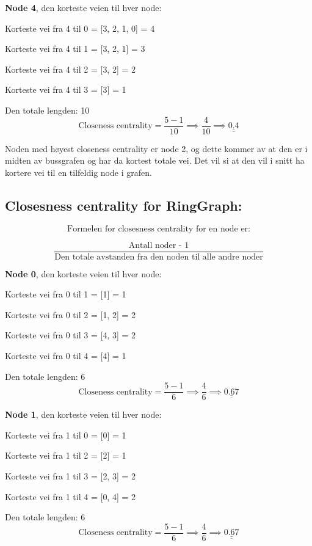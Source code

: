 \documentclass[11pt]{article}
\begin{document}
\textbf{Node 4}, den korteste veien til hver node:

Korteste vei fra 4 til 0 = {[}3, 2, 1, 0{]} = 4

Korteste vei fra 4 til 1 = {[}3, 2, 1{]} = 3

Korteste vei fra 4 til 2 = {[}3, 2{]} = 2

Korteste vei fra 4 til 3 = {[}3{]} = 1

Den totale lengden: 10
\[\text{Closeness centrality} = \frac{5 - 1}{10} \implies \frac{4}{10} \implies\underline{\underline{ 0.4 }}\]

Noden med høyest closeness centrality er node 2, og dette kommer av at
den er i midten av bussgrafen og har da kortest totale vei. Det vil si
at den vil i snitt ha kortere vei til en tilfeldig node i grafen.

    \hypertarget{closesness-centrality-for-ringgraph}{%
\subsection*{Closesness centrality for
RingGraph:}\label{closesness-centrality-for-ringgraph}}

\[\text{Formelen for closesness centrality for en node er:}\]

\[\frac{\text{Antall noder - 1}}{\text{Den totale avstanden fra den noden til alle andre noder}}\]

\textbf{Node 0}, den korteste veien til hver node:

Korteste vei fra 0 til 1 = {[}1{]} = 1

Korteste vei fra 0 til 2 = {[}1, 2{]} = 2

Korteste vei fra 0 til 3 = {[}4, 3{]} = 2

Korteste vei fra 0 til 4 = {[}4{]} = 1

Den totale lengden: 6
\[\text{Closeness centrality} = \frac{5 - 1}{6} \implies \frac{4}{6} \implies\underline{\underline{ 0.67 }}\]

\textbf{Node 1}, den korteste veien til hver node:

Korteste vei fra 1 til 0 = {[}0{]} = 1

Korteste vei fra 1 til 2 = {[}2{]} = 1

Korteste vei fra 1 til 3 = {[}2, 3{]} = 2

Korteste vei fra 1 til 4 = {[}0, 4{]} = 2

Den totale lengden: 6
\[\text{Closeness centrality} = \frac{5 - 1}{6} \implies \frac{4}{6} \implies\underline{\underline{ 0.67 }}\]
\end{document}
